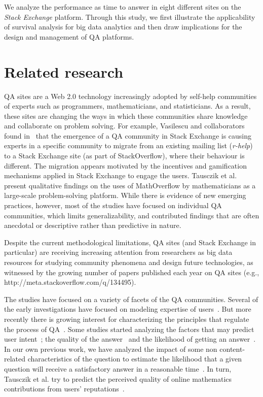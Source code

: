 \documentclass{chi2012}
\begin{document}
We analyze the performance as time to answer in eight different sites on the 
\textit{Stack Exchange} platform. Through this study, we first illustrate the 
applicability of survival analysis for big data analytics and then draw implications 
for the design and management of QA platforms.

\section{Related research}
QA sites are a Web 2.0 technology increasingly adopted by self-help communities of experts 
such as programmers, mathematicians, and statisticians. As a result, these sites are 
changing the ways in which these communities share knowledge and collaborate on problem solving. 
For example, Vasilescu and collaborators found in~\cite{vasilescu2014} that the emergence 
of a QA community in Stack Exchange is causing experts in a specific community to migrate 
from an existing mailing list (\textit{r-help}) to a Stack Exchange site (as part of StackOverflow), 
where their behaviour is different. The migration appears motivated by the incentives 
and gamification mechanisms applied in Stack Exchange to engage the users. Tausczik et
al.~\cite{tausczik2014} present qualitative findings on the uses of MathOverflow by
mathematicians as a large-scale problem-solving platform. While there is evidence of 
new emerging practices, however, most of the studies have focused on individual QA 
communities, which limits generalizability, and contributed findings that are often 
anecdotal or descriptive rather than predictive in nature.

Despite the current methodological limitations, QA sites (and Stack Exchange in particular) 
are receiving increasing attention from researchers as big data resources for 
studying community phenomena and design future technologies, as witnessed by the 
growing number of papers published each year on QA sites 
(e.g., http://meta.stackoverflow.com/q/134495). 

The studies have focused on a variety of facets of the QA communities. Several of the 
early investigations have focused on modeling expertise of users~\cite{zhang2007,adamic2008}.
But more recently there is growing interest for characterizing the principles that 
regulate the process of QA~\cite{anderson2012}. Some studies started analyzing the 
factors that may predict user intent~\cite{chen2012}; the quality of the answer~\cite{wang2013}
and the likelihood of getting an answer~\cite{treude2011}. In our own previous work, 
we have analyzed the impact of some non content-related characteristics of the 
question to estimate the likelihood that a given question will receive a satisfactory 
answer in a reasonable time~\cite{piccardi2014}. In turn, Tausczik et al. try to 
predict the perceived quality of online mathematics contributions from users' 
reputations~\cite{tausczik2011,tausczik2012}.
\end{document}
